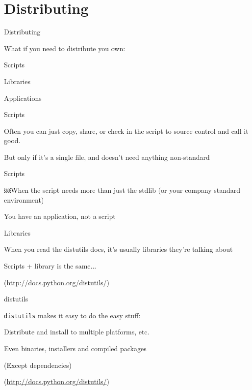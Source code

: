 \documentclass{beamer}
\begin{document}
\section{Distributing}

\begin{frame}[fragile]{Distributing}

{\LARGE What if you need to distribute you own:}

\vfill
{\Large Scripts}

\vfill
{\large Libraries }

\vfill
{\large Applications }
\vfill

\end{frame} 

\begin{frame}[fragile]{Scripts}

\vfill
{\LARGE Often you can just copy, share, or check in the script to source
control and call it good.}

\vfill
But only if it's a single file, and doesn't need anything non-standard
\end{frame} 

\begin{frame}[fragile]{Scripts}

\vfill
{\LARGE ￼When the script needs more than just the stdlib (or your company standard environment)}

\vfill
{\LARGE You have an application, not a script}

\vfill

\end{frame} 

\begin{frame}[fragile]{Libraries}

\vfill
{\LARGE When you read the distutils docs, it's usually libraries they’re talking about}


\vfill
{\LARGE Scripts + library is the same...}


\vfill
(\url{http://docs.python.org/distutils/})
\end{frame} 

\begin{frame}[fragile]{distutils}

\vfill
{\LARGE \verb|distutils| makes it easy to do the easy stuff:}

\vfill
{\Large Distribute and install to multiple platforms, etc.}

\vfill
{\Large Even binaries, installers and compiled packages}

\vfill
{\Large (Except dependencies)}

\vfill
(\url{http://docs.python.org/distutils/})
\end{frame} 
\end{document}
